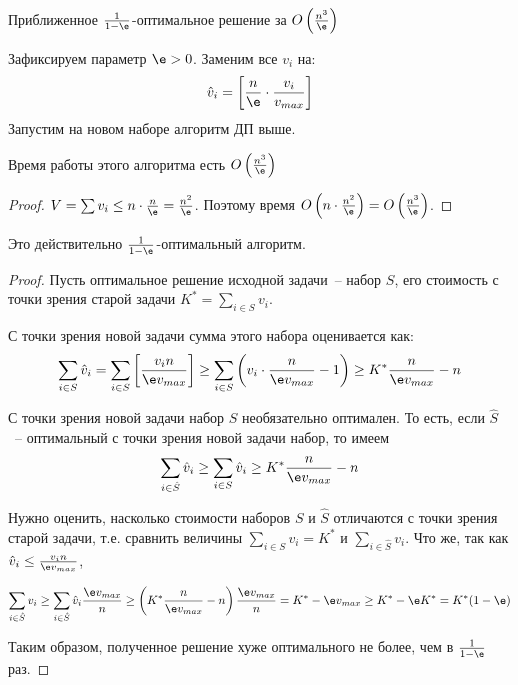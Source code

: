 \begin{algodescription}{Приближенное $\frac{1}{1-\e}$-оптимальное решение за $O\left(\frac{n^3}{\e}\right)$}

Зафиксируем параметр $\e>0$. Заменим все $v_i$ на: $$\hat{v}_i = \left[\frac{n}{\e} \cdot \frac{v_i}{v_{max}}\right]$$ Запустим на новом наборе алгоритм ДП выше.
\end{algodescription}

\begin{theorem*}
    Время работы этого алгоритма есть $O\left(\frac{n^3}{\e}\right)$
\end{theorem*}
\begin{proof}
    $V = \sum v_i \leq n\cdot \frac{n}{\e} = \frac{n^2}{\e}$. Поэтому время $O\left(n \cdot \frac{n^2}{\e}\right) = O\left(\frac{n^3}{\e}\right)$.
\end{proof}

\begin{theorem*}
    Это действительно $\frac{1}{1-\e}$-оптимальный алгоритм.
\end{theorem*}
\begin{proof}
Пусть оптимальное решение исходной задачи~-- набор $S$, его стоимость с точки зрения старой задачи $K^* = \sum\limits_{i\in S} v_i$.

С точки зрения новой задачи сумма этого набора оценивается как:
$$\sum_{i\in S}\hat{v}_i = \sum_{i\in S} \left[\frac{v_i n}{\e v_{max}}\right] \geq \sum_{i\in S} \left(v_i \cdot \frac{n}{\e v_{max}} - 1\right) \geq K^*\frac{n}{\e v_{max}} - n$$

С точки зрения новой задачи набор $S$ необязательно оптимален. То есть, если $\hat{S}$~-- оптимальный с точки зрения новой задачи набор, то имеем $$\sum_{i\in\hat S}\hat{v}_i \geq \sum_{i\in S} \hat{v}_i \geq K^*\frac{n}{\e v_{max}} - n$$

Нужно оценить, насколько стоимости наборов $S$ и $\hat S$ отличаются с точки зрения старой задачи, т.е. сравнить величины $\sum\limits_{i\in S}v_i = K^*$ и $\sum\limits_{i\in\hat S}v_i$. Что же, так как $\hat{v}_i \leq \frac{v_i n}{\e v_{max}}$,

$$\sum_{i\in\hat S}v_i \geq \sum_{i\in\hat S} \hat{v}_i \frac{\e v_{max}}{n} \geq \left(K^*\frac{n}{\e v_{max}} - n\right)\frac{\e v_{max}}{n} = K^* - \e v_{max} \geq K^* - \e K^* = K^*(1-\e)$$

Таким образом, полученное решение  хуже оптимального не более, чем в $\frac{1}{1-\e}$ раз.
\end{proof}
